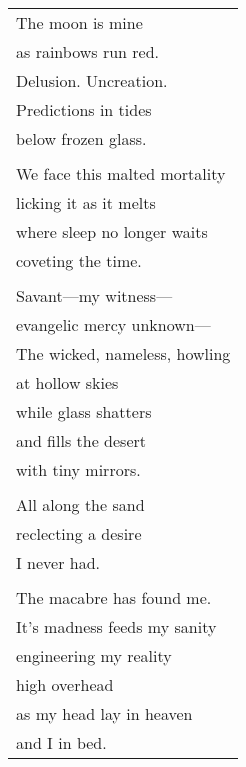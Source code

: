 \documentclass{article}
\begin{document}
\begin{center}
\begin{tabular}{l}
\end{tabular}
\begin{tabular}{l}
The moon is mine \\
as rainbows run red. \\
Delusion. Uncreation. \\
Predictions in tides \\
below frozen glass. \\
\\
We face this malted mortality \\
licking it as it melts \\
where sleep no longer waits \\
coveting the time. \\
\\
Savant---my witness--- \\
evangelic mercy unknown--- \\
The wicked, nameless, howling \\
at hollow skies \\
while glass shatters \\
and fills the desert \\
with tiny mirrors. \\
\\
All along the sand \\
reclecting a desire \\
I never had. \\
\\
The macabre has found me. \\
It's madness feeds my sanity \\
engineering my reality \\
high overhead \\
as my head lay in heaven \\
and I in bed. \\
\end{tabular}
\end{center}
\end{document}
